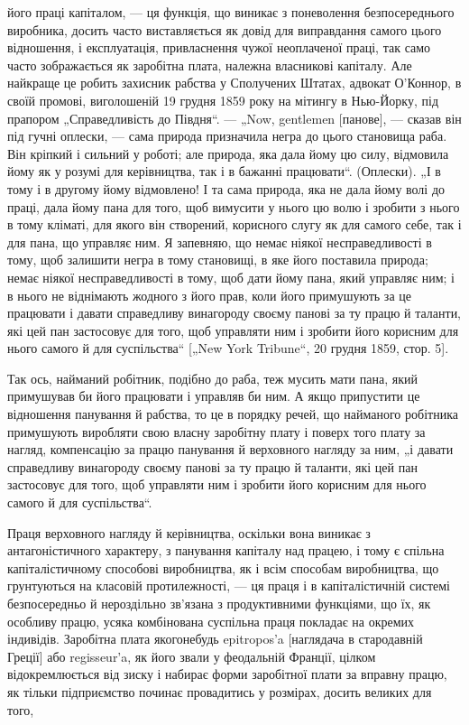 \parcont{}  %
його праці капіталом, — ця функція, що виникає з поневолення
безпосереднього виробника, досить часто виставляється як довід
для виправдання самого цього відношення, і експлуатація, привласнення
чужої неоплаченої праці, так само часто зображається
як заробітна плата, належна власникові капіталу. Але найкраще
це робить захисник рабства у Сполучених Штатах, адвокат
О’Коннор, в своїй промові, виголошеній 19 грудня 1859 року
на мітингу в Нью-Йорку, під прапором „Справедливість до
Півдня“. — „Now, gentlemen [панове], — сказав він під гучні
оплески, — сама природа призначила негра до цього становища
раба. Він кріпкий і сильний у роботі; але природа, яка дала
йому цю силу, відмовила йому як у розумі для керівництва, так
і в бажанні працювати“. (Оплески). „І в тому і в другому йому
відмовлено! І та сама природа, яка не дала йому волі до праці,
дала йому пана для того, щоб вимусити у нього цю волю і
зробити з нього в тому кліматі, для якого він створений, корисного
слугу як для самого себе, так і для пана, що управляє
ним. Я запевняю, що немає ніякої несправедливості в тому, щоб
залишити негра в тому становищі, в яке його поставила природа;
немає ніякої несправедливості в тому, щоб дати йому пана, який
управляє ним; і в нього не віднімають жодного з його прав, коли
його примушують за це працювати і давати справедливу винагороду
своєму панові за ту працю й таланти, які цей пан застосовує
для того, щоб управляти ним і зробити його корисним
для нього самого й для суспільства“ [„New York Tribune“,
20 грудня 1859, стор. 5].

Так ось, найманий робітник, подібно до раба, теж мусить
мати пана, який примушував би його працювати і управляв би
ним. А якщо припустити це відношення панування й рабства,
то це в порядку речей, що найманого робітника примушують
виробляти свою власну заробітну плату і поверх того плату
за нагляд, компенсацію за працю панування й верховного нагляду
за ним, „і давати справедливу винагороду своєму панові
за ту працю й таланти, які цей пан застосовує для того, щоб
управляти ним і зробити його корисним для нього самого й для
суспільства“.

Праця верховного нагляду й керівництва, оскільки вона виникає
з антагоністичного характеру, з панування капіталу над працею,
і тому є спільна капіталістичному способові виробництва,
як і всім способам виробництва, що грунтуються на класовій
протилежності, — ця праця і в капіталістичній системі безпосередньо
й нероздільно зв’язана з продуктивними функціями, що
їх, як особливу працю, усяка комбінована суспільна праця покладає
на окремих індивідів. Заробітна плата якогонебудь epitropos’a
[наглядача в стародавній Греції] або regisseur’a, як його звали
у феодальній Франції, цілком відокремлюється від зиску і набирає
форми заробітної плати за вправну працю, як тільки підприємство
починає провадитись у розмірах, досить великих для того,
\parbreak{}  %
